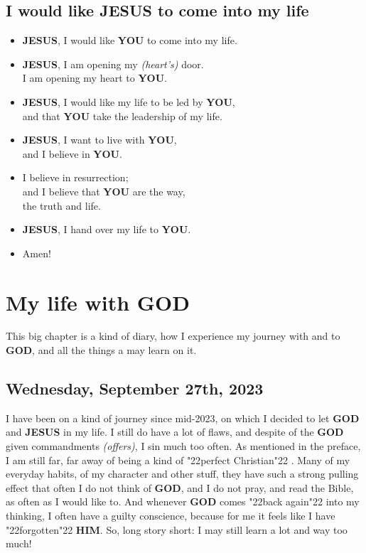 \documentclass[12pt,a4paper]{article}
\newcommand{\God}[0]{\textbf{GOD}}
\newcommand{\Him}[0]{\textbf{HIM}}
\newcommand{\Jesus}[0]{\textbf{JESUS}}
\newcommand{\You}[0]{\textbf{YOU}}
\newcommand{\q}[1]{\char"22{#1}\char"22 }
\begin{document}
	\subsection{I would like {\Jesus} to come into my life}
		\begin{itemize}[nosep]
			\item	{\Jesus},
					I would like {\You} to come into my life.
			\item	{\Jesus},
					I am opening my \textit{(heart's)} door.
					\\
					I am opening my heart to {\You}.
			\item	{\Jesus},
					I would like my life to be led by {\You},
					\\
					and that {\You} take the leadership of my life.
			\item	{\Jesus},
					I want to live with {\You},
					\\
					and I believe in {\You}.
			\item	I believe in resurrection;
					\\
					and I believe that {\You} are the way,
					\\
					the truth and life.
			\item	{\Jesus},
					I hand over my life to {\You}.
			\item	Amen!
		\end{itemize}

	\newpage
	\section{My life with {\God}} \label{MeinLebenMitGott}
		This big chapter is a kind of diary,
		how I experience my journey with and to {\God},
		and all the things a may learn on it.
	
	\subsection{Wednesday, September 27th, 2023}
		I have been on a kind of journey since mid-2023,
		on which I decided to let {\God} and {\Jesus} in my life.
		I still do have a lot of flaws,
		and despite of the {\God} given commandments \textit{(offers)},
		I sin much too often.
		As mentioned in the preface,
		I am still far,
		far away of being a kind of \q{perfect Christian}.
		Many of my everyday habits,
		of my character and other stuff,
		they have such a strong pulling effect
		that often I do not think of {\God},
		and I do not pray,
		and read the Bible,
		as often as I would like to.
		And whenever {\God} comes \q{back again} into my thinking,
		I often have a guilty conscience,
		because for me it feels like I have \q{forgotten} {\Him}.
		So,
		long story short:
		I may still learn a lot and way too much!
\end{document}
